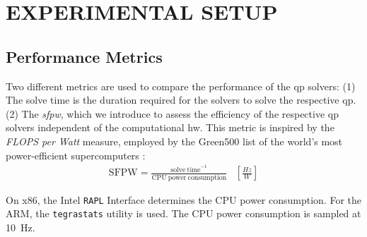 \section{EXPERIMENTAL SETUP}%
\label{sec:setup}

\subsection{Performance Metrics}%
\label{sec:performance}
Two different metrics are used to compare the performance of the \gls{qp} solvers:
(1) The solve time is the duration required for the solvers to solve the respective \gls{qp}.
(2) The \textit{\acrfull{sfpw}}, which we introduce to assess the efficiency of the respective \gls{qp} solvers independent of the computational \gls{hw}. This metric is inspired by the \textit{FLOPS per Watt} measure, employed by the Green500 list of the world's most power-efficient supercomputers \cite{hemmert_green_2010}:
\begin{gather}
    \mathrm{SFPW}=\frac{{\mathrm{solve~time}}^{-1}}{\mathrm{CPU~power~consumption}} \; \; \; \left[\frac{Hz}{W}\right]
    \label{eq:sfpw_calculation}
\end{gather} %

On x86, the Intel \texttt{RAPL} Interface determines the CPU power consumption.
For the ARM, the \texttt{tegrastats} utility is used. %
The CPU power consumption is sampled at \qty{10}{\hertz}.

